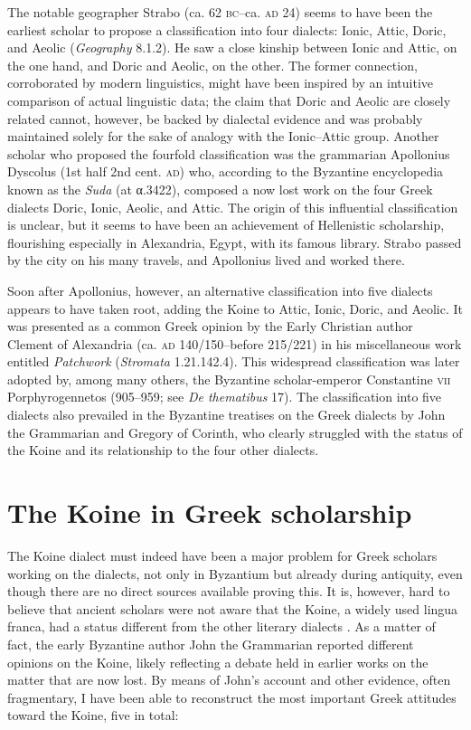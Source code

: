 The notable geographer Strabo (ca. 62 \textsc{bc–}ca. \textsc{ad} 24) seems to have been the earliest scholar to propose a classification into four dialects: Ionic, Attic, Doric, and Aeolic (\textit{Geography} 8.1.2). He saw a close kinship between Ionic and Attic, on the one hand, and Doric and Aeolic, on the other. The former connection, corroborated by modern linguistics, might have been inspired by an intuitive comparison of actual linguistic data; the claim that Doric and Aeolic are closely related cannot, however, be backed by dialectal evidence and was probably maintained solely for the sake of analogy with the Ionic–Attic group. Another scholar who proposed the fourfold classification was the grammarian Apollonius Dyscolus (1st half 2nd cent. \textsc{ad}) who, according to the Byzantine encyclopedia known as the \textit{Suda} (at α.3422), composed a now lost work on the four Greek dialects Doric, Ionic, Aeolic, and Attic. The origin of this influential classification is unclear, but it seems to have been an achievement of Hellenistic scholarship, flourishing especially in Alexandria, Egypt, with its famous library. Strabo passed by the city on his many travels, and Apollonius lived and worked there.

Soon after Apollonius, however, an alternative classification into five dialects appears to have taken root, adding the Koine to Attic, Ionic, Doric, and Aeolic. It was presented as a common Greek opinion by the Early Christian author Clement of Alexandria (ca. \textsc{ad} 140/150–before 215/221) in his miscellaneous work entitled \textit{Patchwork} (\textit{Stromata} 1.21.142.4). This widespread classification was later adopted by, among many others, the Byzantine scholar-emperor Constantine \textsc{vii} Porphyrogennetos (905–959; see \textit{De thematibus} 17). The classification into five dialects also prevailed in the Byzantine treatises on the Greek dialects by John the Grammarian and Gregory of Corinth, who clearly struggled with the status of the Koine and its relationship to the four other dialects.

\section{The Koine in Greek scholarship}\label{sec:2.3}

The Koine dialect must indeed have been a major problem for Greek scholars working on the dialects, not only in Byzantium but already during antiquity, even though there are no direct sources available proving this. It is, however, hard to believe that ancient scholars were not aware that the Koine, a widely used lingua franca, had a status different from the other literary dialects \citep{Consani2000}. As a matter of fact, the early Byzantine author John the Grammarian reported different opinions on the Koine, likely reflecting a debate held in earlier works on the matter that are now lost. By means of John’s account and other evidence, often fragmentary, I have been able to reconstruct the most important Greek attitudes toward the Koine, five in total:

